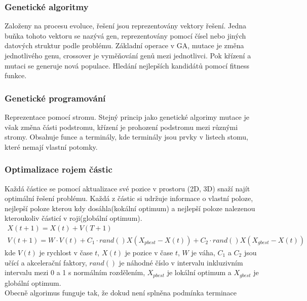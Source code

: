 \subsubsection{Genetické algoritmy}
Založeny na procesu evoluce, řešení jsou reprezentovány vektory řešení. Jedna buňka tohoto vektoru se nazývá gen, reprezentovány pomocí čísel nebo jiných datových
struktur podle problému. Základní operace v GA, mutace je změna jednotlivého genu, crossover je vyměňování genů mezi jednotlivci. Pok křízení a mutaci se generuje
nová populace. Hledání nejlepších kandidátů pomocí fitness funkce.

\subsubsection{Genetické programování}
Reprezentace pomocí stromu. Stejný princip jako genetické algorimy mutace je však změna části podstromu, křízení je prohození podstromu mezi různými stromy. 
Obsahuje funce a terminály, kde terminály jsou prvky v listech stomu, které nemají vlastní potomky. 

\subsubsection{Optimalizace rojem částic}
Každá částice se pomocí aktualizace své pozice v prostoru (2D, 3D) snaží najít optimální řešení problému. Každá z částic si udržuje informace o vlastní poloze, nejlepší poloze
kterou kdy dosáhla(kokální optimum) a nejlepší poloze nalezenou kteroukoliv částicí v roji(globální optimum). 
\begin{gather*}
    X(t+1) = X(t) + V(T+1)\\
    V(t+1) = W\cdot V(t) + C_1\cdot rand()X(X_{pbest}-X(t)) + C_2\cdot rand()X(X_{gbest}-X(t))
\end{gather*}
kde \(V(t)\) je rychlost v čase \(t\), \(X(t)\) je pozice v čase \(t\), \(W\) je váha, \(C_1\) a \(C_2\) jsou učící a akcelerační faktory, \(rand()\) je náhodné
číslo v intervalu inkluzivním intervalu mezi 0 a 1 s normálním rozdělením, \(X_ {pbest}\) je lokální optimum a \(X_{gbest}\) je globální optimum. \\
Obecně algorimus funguje tak, že dokud není splněna podmínka terminace 

